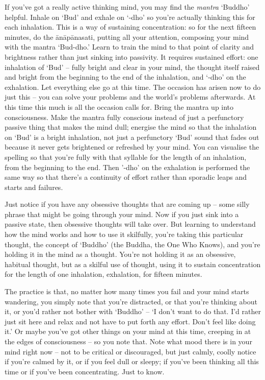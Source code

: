 
If you've got a really active thinking mind, you may find the \textit{mantra} `Buddho' helpful. Inhale on `Bud' and exhale on `-dho' so you're actually thinking this for each inhalation. This is a way of sustaining concentration: so for the next fifteen minutes, do the ānāpānasati, putting all your attention, composing your mind with the mantra `Bud-dho.' Learn to train the mind to that point of clarity and brightness rather than just sinking into passivity. It requires sustained effort: one inhalation of `Bud' -- fully bright and clear in your mind, the thought itself raised and bright from the beginning to the end of the inhalation, and `-dho' on the exhalation. Let everything else go at this time. The occasion has arisen now to do just this -- you can solve your problems and the world's problems afterwards. At this time this much is all the occasion calls for. Bring the mantra up into consciousness. Make the mantra fully conscious instead of just a perfunctory passive thing that makes the mind dull; energise the mind so that the inhalation on `Bud' is a bright inhalation, not just a perfunctory `Bud' sound that fades out because it never gets brightened or refreshed by your mind. You can visualise the spelling so that you're fully with that syllable for the length of an inhalation, from the beginning to the end. Then '-dho' on the exhalation is performed the same way so that there's a continuity of effort rather than sporadic leaps and starts and failures.

Just notice if you have any obsessive thoughts that are coming up -- some silly phrase that might be going through your mind. Now if you just sink into a passive state, then obsessive thoughts will take over. But learning to understand how the mind works and how to use it skilfully, you're taking this particular thought, the concept of `Buddho' (the Buddha, the One Who Knows), and you're holding it in the mind as a thought. You're not holding it as an obsessive, habitual thought, but as a skilful use of thought, using it to sustain concentration for the length of one inhalation, exhalation, for fifteen minutes.

The practice is that, no matter how many times you fail and your mind starts wandering, you simply note that you're distracted, or that you're thinking about it, or you'd rather not bother with `Buddho' -- `I don't want to do that. I'd rather just sit here and relax and not have to put forth any effort. Don't feel like doing it.' Or maybe you've got other things on your mind at this time, creeping in at the edges of consciousness -- so you note that. Note what mood there is in your mind right now -- not to be critical or discouraged, but just calmly, coolly notice if you're calmed by it, or if you feel dull or sleepy; if you've been thinking all this time or if you've been concentrating. Just to know.

